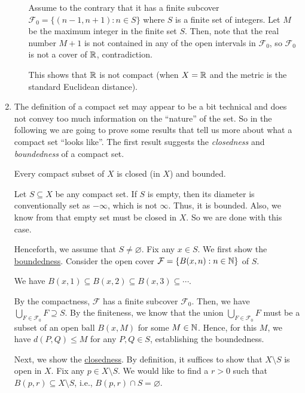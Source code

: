 \begin{enumerate}
\begin{itemize}
\begin{pf}
Assume to the contrary that it has a finite subcover
\(\mathcal{F}_0=\{(n-1,n+1):n\in S\}\) where \(S\) is a finite set of integers.
Let \(M\) be the maximum integer in the finite set \(S\). Then, note that the
real number \(M+1\) is not contained in any of the open intervals in
\(\mathcal{F}_0\), so \(\mathcal{F}_0\) is not a cover of \(\mathbb{R}\),
contradiction.
\end{pf}

This shows that \(\mathbb{R}\) is not compact (when \(X=\mathbb{R}\) and the metric is the
standard Euclidean distance).
\end{itemize}

\item The definition of a compact set may appear to be a bit technical and does
not convey too much information on the ``nature'' of the set. So in the
following we are going to prove some results that tell us more about what a
compact set ``looks like''. The first result suggests the \emph{closedness} and
\emph{boundedness} of a compact set.

\begin{theorem}
\label{thm:compact-imp-closed-bounded}
Every compact subset of \(X\) is closed (in \(X\)) and bounded.
\end{theorem}
\begin{pf}
Let \(S\subseteq X\) be any compact set. If \(S\) is empty, then its diameter
is conventionally set as \(-\infty\), which is not \(\infty\). Thus, it is
bounded. Also, we know from  that empty set must
be closed in \(X\). So we are done with this case.

Henceforth, we assume that \(S\ne\varnothing\). Fix any \(x\in S\). We first
show the \underline{boundedness}. Consider the open cover
\(\mathcal{F}=\{B(x,n):n\in\mathbb{N}\}\) of \(S\). \begin{note} We have
\(B(x,1)\subseteq B(x,2)\subseteq B(x,3)\subseteq \dotsb\).  \end{note} By the
compactness, \(\mathcal{F}\) has a finite subcover \(\mathcal{F}_0\).  Then, we
have \(\bigcup_{F\in\mathcal{F}_0}F\supseteq S\). By the finiteness, we know
that the union \(\bigcup_{F\in\mathcal{F}_0}F\) must be a subset
of an open ball \(B(x,M)\) for some \(M\in\mathbb{N}\). Hence, for this \(M\), we have
\(d(P,Q)\le M\) for any \(P,Q\in S\), establishing the boundedness.

Next, we show the \underline{closedness}. By definition, it suffices to show
that \(X\setminus S\) is open in \(X\). Fix any \(p\in X\setminus S\). We would
like to find a \(r>0\) such that \(B(p,r)\subseteq X\setminus S\), i.e.,
\(B(p,r)\cap S=\varnothing\).


\end{pf}
\end{enumerate}
